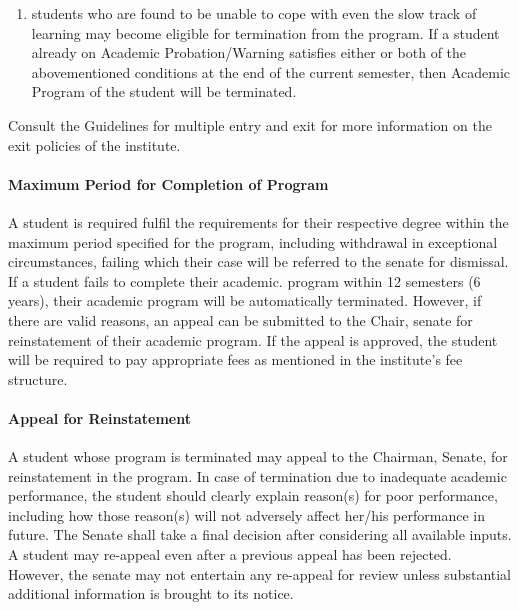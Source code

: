 \begin{enumerate}[leftmargin=15mm, resume]
    \begin{enumerate}
        \item She/he shall register with higher priority for those courses (or their substitute) in which a failed grade is obtained.
        \item She/he shall not hold any office in the Hall of Residence, Students Gymkhana or any other organization/body.
        \item She/he may face early termination if the academic performance is not improved.
        \item Any other terms and conditions laid down by the \acrshort{sugc}/\Gls{senate}.
    \end{enumerate}

    \item \Glspl{student} who are found to be unable to cope with even the slow track of learning may become eligible for termination from the program. If a \gls{student} already on Academic Probation/Warning satisfies either or both of the abovementioned conditions at the end of the current semester, then Academic Program of the \gls{student} will be terminated.
\end{enumerate}

Consult the Guidelines for multiple entry and exit for more information on the exit policies of the \gls{institute}.

\paragraph{Maximum Period for Completion of Program} A \gls{student} is required fulfil the requirements for their respective degree within the maximum period specified for the program, including withdrawal in exceptional circumstances, failing which their case will be referred to the \Gls{senate} for dismissal. If a \gls{student} fails to complete their academic. program within 12 semesters (6 years), their academic program will be automatically terminated. However, if there are valid reasons, an appeal can be submitted to the Chair, \gls{senate} for reinstatement of their academic program. If the appeal is approved, the \gls{student} will be required to pay appropriate fees as mentioned in the \gls{institute}'s fee structure.

\paragraph{Appeal for Reinstatement} A \gls{student} whose program is terminated may appeal to the Chairman, Senate, for reinstatement in the program. In case of termination due to inadequate academic performance, the \gls{student} should clearly explain reason(s) for poor performance, including how those reason(s) will not adversely affect her/his performance in future. The Senate shall take a final decision after considering all available inputs. A \gls{student} may re-appeal even after a previous appeal has been rejected. However, the \Gls{senate} may not entertain any re-appeal for review unless substantial additional information is brought to its notice.

